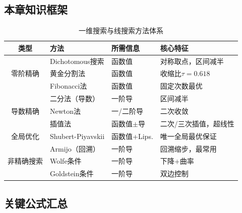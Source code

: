 \subsection{本章知识框架}

\begin{table}[H]
\centering
\small
\caption{一维搜索与线搜索方法体系}
\setlength{\tabcolsep}{4pt}
\begin{tabular}{@{}c>{\raggedright\arraybackslash}p{2.6cm}>{\raggedright\arraybackslash}p{2cm}>{\raggedright\arraybackslash}p{4.8cm}@{}}
\toprule
\textbf{类型} & \textbf{方法} & \textbf{所需信息} & \textbf{核心特征} \\
\midrule
\multirow{3}{*}{零阶精确} & Dichotomous搜索 & 函数值 & 对称取点，区间减半 \\
 & 黄金分割法 & 函数值 & 收缩比$\tau=0.618$ \\
 & Fibonacci法 & 函数值 & 固定次数最优 \\
\midrule
\multirow{3}{*}{导数精确} & 二分法（导数） & 一阶导 & 区间减半 \\
 & Newton法 & 一/二阶导 & 二次收敛 \\
 & 插值法 & 函数值$\pm$导 & 二次/三次插值，超线性 \\
\midrule
全局优化 & Shubert-Piyavskii & 函数值+Lips. & 唯一全局最优保证 \\
\midrule
\multirow{3}{*}{非精确搜索} & Armijo（回溯） & 一阶导 & 回溯缩步，最常用 \\
 & Wolfe条件 & 一阶导 & 下降+曲率 \\
 & Goldstein条件 & 一阶导 & 双边控制 \\
\bottomrule
\end{tabular}
\end{table}

\subsection{关键公式汇总}

